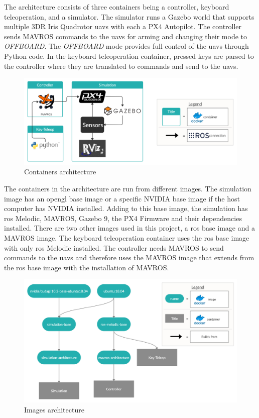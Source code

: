 The architecture consists of three containers being a controller, keyboard teleoperation, and a simulator. The simulator runs a Gazebo world that supports multiple 3DR Iris Quadrotor \acsp{uav} with each a PX4 Autopilot. The controller sends MAVROS commands to the \acsp{uav} for arming and changing their mode to \textit{OFFBOARD}. The \textit{OFFBOARD} mode provides full control of the \acsp{uav} through Python code. In the keyboard teleoperation container, pressed keys are parsed to the controller where they are translated to commands and send to the \acsp{uav}.

\begin{figure}[!h]
  \centering
  \includegraphics[width=
  \linewidth]{images/architecture_containers.png}
  \caption{Containers architecture}
\end{figure}

The containers in the architecture are run from different images. The simulation image has an \acs{opengl} base image or a specific NVIDIA base image if the host computer has NVIDIA installed. Adding to this base image, the simulation has \acs{ros} Melodic, MAVROS, Gazebo 9, the PX4 Firmware and their dependencies installed. There are two other images used in this project, a \acs{ros} base image and a MAVROS image. The keyboard teleoperation container uses the \acs{ros} base image with only \acs{ros} Melodic installed. The controller needs MAVROS to send commands to the \acsp{uav} and therefore uses the MAVROS image that extends from the \acs{ros} base image with the installation of MAVROS.

\begin{figure}[!h]
  \centering
  \includegraphics[width=0.8\linewidth]{images/architecture_images.png}
  \caption{Images architecture}
\end{figure}

